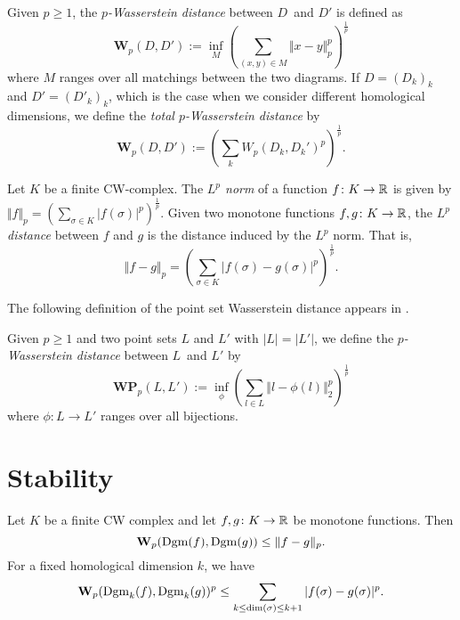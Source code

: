 	\begin{defn}
		Given $p\geq 1$, the \textit{$p$-Wasserstein distance} between $D$ and $D'$ is defined as
		$$
			\textbf{W}_p(D,D') := \inf_{M} \left(\sum_{(x,y)\in M}\Vert x-y\Vert^p_p\right)^{\frac{1}{p}}
		$$
		where $M$ ranges over all matchings between the two diagrams. If $D=(D_k)_k$ and $D'=(D'_k)_k$, which is the case when we consider different homological dimensions, we define the \textit{total $p$-Wasserstein distance} by
		$$
			\textbf{W}_p(D,D') := \left(\sum_k W_p(D_k,D_k')^p\right)^{\frac{1}{p}}.
		$$
	\end{defn}

	\begin{defn}[$L^p$ norm]
		Let $K$ be a finite CW-complex. The \textit{$L^p$ norm} of a function $f\colon K\to\mathbb{R}$ is given by $\Vert f\Vert_p = \left(\sum_{\sigma\in K}\vert f(\sigma)\vert^p\right)^{\frac{1}{p}}$. Given two monotone functions $f,g\colon K\to\mathbb{R}$, the \textit{$L^p$ distance} between $f$ and $g$ is the distance induced by the $L^p$ norm. That is,
		$$
		\Vert f-g\Vert_p = \left(\sum_{\sigma\in K}\vert f(\sigma) - g(\sigma)\vert^p\right)^{\frac{1}{p}}.
		$$
	\end{defn}

	 The following definition of the point set Wasserstein distance appears in \autocite{skraba2022wasserstein}.

	\begin{defn}
		Given $p\geq 1$ and two point sets $L$ and $L'$ with $|L|=|L'|$, we define the \textit{$p$-Wasserstein distance} between $L$ and $L'$ by
		$$
		\textbf{WP}_p(L,L') := \inf_{\phi}\left(\sum_{l\in L}\Vert l - \phi(l)\Vert_2^p\right)^{\frac{1}{p}}
		$$
		where $\phi\colon L\to L'$ ranges over all bijections.
	\end{defn}

	\section{Stability}
	\begin{thm}\label{thm:cellular_wasserstein_stability}
		Let $K$ be a finite CW complex and let $f,g\colon K\to\mathbb{R}$ be monotone functions. Then
		$$
			\textbf{W}_p(\operatorname{Dgm}(f), \operatorname{Dgm}(g))\leq\Vert f-g\Vert_p.
		$$
		For a fixed homological dimension $k$, we have
		$$
			\textbf{W}_p(\operatorname{Dgm}_k(f), \operatorname{Dgm}_k(g))^p \leq \sum_{k\leq \dim(\sigma)\leq k+1}\vert f(\sigma)-g(\sigma)\vert^p.
		$$
	\end{thm}

